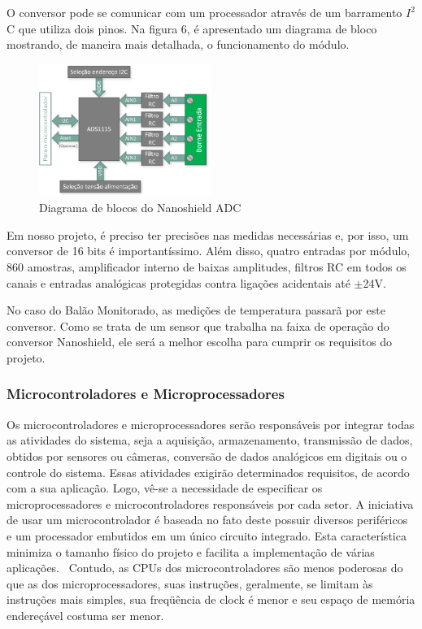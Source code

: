 			O conversor pode se comunicar com um processador através de um barramento $I^2$C que utiliza dois pinos. Na figura 6, é apresentado um diagrama de bloco  mostrando, de maneira mais detalhada, o funcionamento do módulo.

			\begin{figure}[h!]
				\centering
				\includegraphics[width=0.5\textwidth]{figuras/diagramaNanoshield}
				\caption{Diagrama de blocos do Nanoshield ADC}
				\label{img:diagramaNanoshield}
			\end{figure}

			Em nosso projeto, é preciso ter precisões nas medidas necessárias e, por isso, um conversor de 16 bits é importantíssimo. Além disso, quatro entradas por módulo, 860 amostras, amplificador interno de baixas amplitudes, filtros RC em todos os canais e entradas analógicas protegidas contra ligações acidentais até $\pm$24V.

			No caso do Balão Monitorado, as medições de temperatura passarã por este conversor. Como se trata de um sensor que trabalha na faixa de operação do conversor Nanoshield, ele será a melhor escolha para cumprir os requisitos do projeto.

\subsubsection{Microcontroladores e Microprocessadores}
	Os microcontroladores e microprocessadores serão responsáveis por integrar todas as atividades do sistema, seja a aquisição, armazenamento, transmissão de dados, obtidos por sensores ou câmeras, conversão de dados analógicos em digitais ou o controle do sistema. Essas atividades exigirão determinados requisitos, de acordo com a sua aplicação. Logo, vê-se a necessidade de especificar os microprocessadores e microcontroladores responsáveis por cada setor. A iniciativa de usar um microcontrolador é baseada no fato deste possuir diversos periféricos e um processador embutidos em um único circuito integrado. Esta característica minimiza o tamanho físico do projeto e facilita a implementação de várias aplicações.~\cite{prado2009}	Contudo, as CPUs dos microcontroladores são menos poderosas do que as dos microprocessadores, suas instruções, geralmente, se limitam às instruções mais simples, sua freqüência de clock é menor e seu espaço de memória endereçável costuma ser menor.~\cite{rucinski2005}

